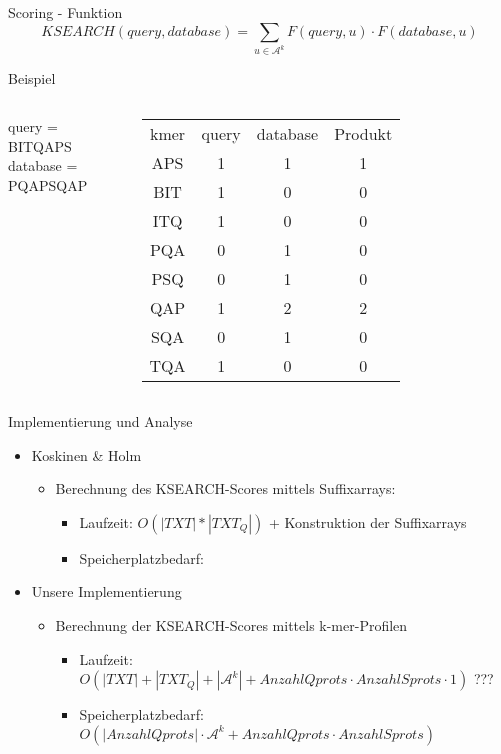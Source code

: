 \documentclass[aspectratio=1610]{beamer}
\begin{document}
\begin{frame}{Scoring - Funktion}
  \begin{equation*}
    KSEARCH(query,database) = \sum_{u \in \mathcal A^k} F(query,u) \cdot F(database,u)
  \end{equation*}  
  \begin{block}{Beispiel}
    \begin{columns}
    query = BITQAPS\\
    database = PQAPSQAP\\  
    \scriptsize\begin{tabular}{cccc}
    kmer & query & database & Produkt\\
    APS & 1 & 1 & 1\\
    BIT & 1 & 0 & 0\\
    ITQ & 1 & 0 & 0 \\
    PQA & 0 & 1 & 0\\
    PSQ & 0 & 1 & 0\\
    QAP & 1 & 2 & 2\\
    SQA & 0 & 1 & 0\\
    TQA & 1 & 0 & 0\\    
    \end{tabular}
    \normalsize
    \end{columns}
  \end{block}
\end{frame}

\begin{frame}{Implementierung und Analyse}
  \begin{itemize}
    \item Koskinen \& Holm
      \begin{itemize}
        \item Berechnung des KSEARCH-Scores mittels Suffixarrays:
          \begin{itemize}
            \item Laufzeit: $O(|TXT|*|TXT_Q|)$ + Konstruktion der Suffixarrays
            \item Speicherplatzbedarf:
          \end{itemize}
      \end{itemize}
    \item Unsere Implementierung
      \begin{itemize}
        \item Berechnung der KSEARCH-Scores mittels k-mer-Profilen
          \begin{itemize}
            \item Laufzeit: $O(|TXT|+|TXT_Q|+|\mathcal A^k|+ Anzahl Qprots \cdot Anzahl Sprots \cdot 1)$ ???
            \item Speicherplatzbedarf: $O(|Anzahl Qprots| \cdot \mathcal A^k + Anzahl Qprots \cdot Anzahl Sprots)$
          \end{itemize}
      \end{itemize}
  \end{itemize}
\end{frame}
\end{document}
